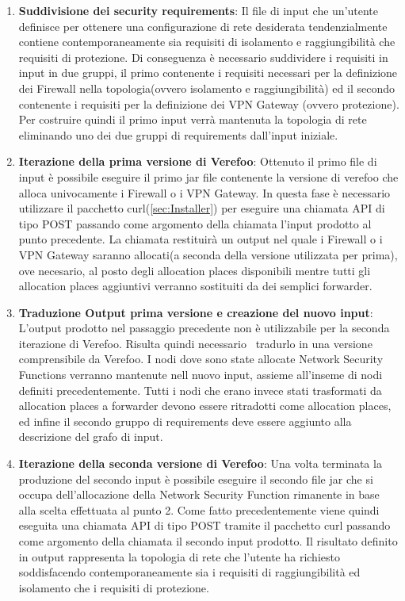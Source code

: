\begin{enumerate}
    \item \textbf{Suddivisione dei security requirements}: Il file di input che un'utente definisce per ottenere una configurazione di rete desiderata tendenzialmente contiene
        contemporaneamente sia requisiti di isolamento e raggiungibilità che requisiti di protezione. Di conseguenza è necessario suddividere i requisiti in input in due gruppi, 
        il primo contenente i requisiti necessari per la definizione dei Firewall nella topologia(ovvero isolamento e raggiungibilità) ed il secondo contenente i requisiti per la 
        definizione dei VPN Gateway (ovvero protezione). Per costruire quindi il primo input verrà mantenuta la topologia di rete eliminando uno 
        dei due gruppi di requirements dall'input iniziale.
    \item \textbf{Iterazione della prima versione di Verefoo}: Ottenuto il primo file di input è possibile eseguire il primo jar file contenente la versione di verefoo che alloca univocamente 
        i Firewall o i VPN Gateway. In questa fase è necessario utilizzare il pacchetto curl(\ref{sec:Installer}) per eseguire una chiamata API di tipo POST passando come argomento della chiamata l'input 
        prodotto al punto precedente. La chiamata restituirà un output nel quale i Firewall o i VPN Gateway saranno allocati(a seconda della versione utilizzata per prima), ove necesario, al posto degli allocation places disponibili mentre tutti gli allocation
        places aggiuntivi verranno sostituiti da dei semplici forwarder. 
    \item \textbf{Traduzione Output prima versione e creazione del nuovo input}: L'output prodotto nel passaggio precedente non è utilizzabile per la seconda iterazione di Verefoo. Risulta quindi necessario
    \   tradurlo in una versione comprensibile da Verefoo. I nodi dove sono state allocate Network Security Functions verranno mantenute nell nuovo input, assieme all'inseme di nodi definiti precedentemente. Tutti i nodi
        che erano invece stati trasformati da allocation places a forwarder devono essere ritradotti come allocation places, ed infine il secondo gruppo di requirements deve essere aggiunto alla descrizione del grafo di input.
    \item \textbf{Iterazione della seconda versione di Verefoo}: Una volta terminata la produzione del secondo input è possibile eseguire il secondo file jar che si occupa dell'allocazione della Network
        Security Function rimanente in base alla scelta effettuata al punto 2. Come fatto precedentemente viene quindi eseguita una chiamata API di tipo POST tramite il pacchetto curl passando come argomento della chiamata
        il secondo input prodotto. Il risultato definito in output rappresenta la topologia di rete che l'utente ha richiesto soddisfacendo contemporaneamente sia i requisiti di raggiungibilità ed isolamento che i requisiti di protezione.
\end{enumerate}

